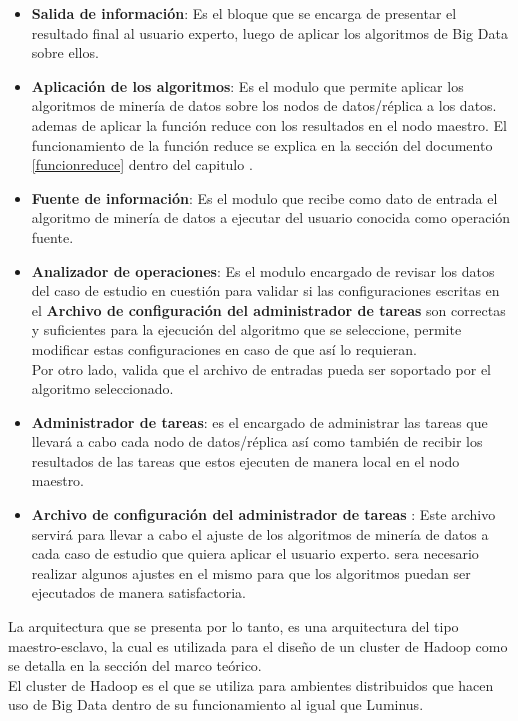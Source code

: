 \begin{itemize}
	\item \textbf{Salida de información}: Es el bloque que se encarga de presentar el resultado final al usuario experto, luego de aplicar los algoritmos de Big Data sobre ellos. 
	\item \textbf{Aplicación de los algoritmos}: Es el modulo que permite aplicar los algoritmos de minería de datos sobre los nodos de datos/réplica a los datos. ademas de aplicar la función reduce con los resultados en el nodo maestro.
	El funcionamiento de la función reduce se explica en la sección del documento \ref{funcionreduce} dentro del capitulo .
	\item \textbf{Fuente de información}: Es el modulo que recibe como dato de entrada el algoritmo de minería de datos a ejecutar del usuario conocida como operación fuente.
	\item \textbf{Analizador de operaciones}: Es el modulo encargado de revisar los datos del caso de estudio en cuestión para validar si las configuraciones escritas en el \textbf{Archivo de configuración del administrador de tareas} son correctas y suficientes para la ejecución del algoritmo que se seleccione, permite modificar estas configuraciones en caso de que así lo requieran. \\
	Por otro lado, valida que el archivo de entradas pueda ser soportado por el algoritmo seleccionado.
	\item \textbf{Administrador de tareas}: es el encargado de administrar las tareas que llevará a cabo cada nodo de datos/réplica así como también de recibir los resultados de las tareas que estos ejecuten de manera local en el nodo maestro. 
	\item \textbf{Archivo de configuración del administrador de tareas }: Este archivo servirá para llevar a cabo el ajuste de los algoritmos de minería de datos a cada caso de estudio que quiera aplicar el usuario experto. sera necesario realizar algunos ajustes en el mismo para que los algoritmos puedan ser ejecutados de manera satisfactoria.
\end{itemize}
La arquitectura que se presenta por lo tanto, es una arquitectura del tipo maestro-esclavo, la cual es utilizada para el diseño de un cluster de Hadoop como se detalla en la sección  del marco teórico. 
\\
El cluster de Hadoop es el que se utiliza para ambientes distribuidos que hacen uso de Big Data dentro de su funcionamiento al igual que Luminus.  